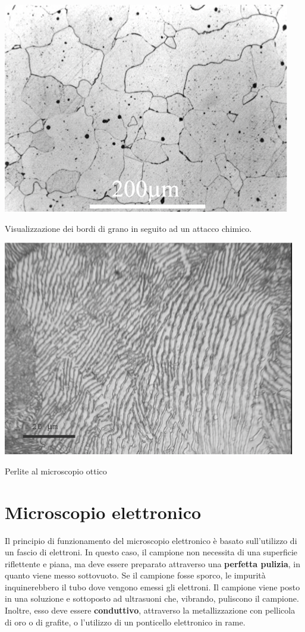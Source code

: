 \begin{marginfigure}[-8cm]
   \includegraphics{images/img18.png}
   \caption{Visualizzazione dei bordi di grano in seguito ad un attacco chimico.}
\end{marginfigure}
   \begin{marginfigure}[-3cm]
   \includegraphics{images/img19.png}
   \caption{Perlite al microscopio ottico}
   \end{marginfigure}

\section{Microscopio elettronico}

Il principio di funzionamento del microscopio elettronico è basato sull’utilizzo di un fascio di elettroni. In questo caso, il campione non necessita di una superficie riflettente e piana, ma deve essere preparato attraverso una \textbf{perfetta pulizia}, in quanto viene messo sottovuoto. Se il campione fosse sporco, le impurità inquinerebbero il tubo dove vengono emessi gli elettroni.
Il campione viene posto in una soluzione e sottoposto ad ultrasuoni che, vibrando, puliscono il campione.\\
Inoltre, esso deve essere \textbf{conduttivo}, attraverso la metallizzazione con pellicola di oro o di grafite, o l’utilizzo di un ponticello elettronico in rame.

